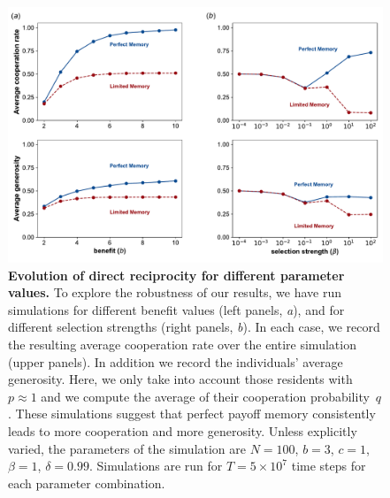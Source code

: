 \documentclass[11pt]{article}
\theoremstyle{plainCl1}
\theoremstyle{plainCl2}
\begin{document}
{\clearpage
\newpage


\begin{figure}[t]
    \centering
    \includegraphics[width=.75\textwidth]{static/cooperation_rate_over_b_and_beta.pdf}
    \caption{{\bf Evolution of direct reciprocity for different parameter values.} 
    To explore the robustness of our results, we have run simulations for different benefit values (left panels, {\it a}), and for different selection strengths (right panels, {\it b}). 
    In each case, we record the resulting average cooperation rate over the entire simulation (upper panels). 
    In addition we record the individuals' average generosity. 
    Here, we only take into account those residents with $p\! \approx\! 1$ and we compute
    the average of their cooperation probability~$q$. 
    These simulations suggest that perfect payoff memory consistently leads to more cooperation and more generosity. 
    Unless explicitly varied, the parameters of the simulation are $N\!=\!100$, $b\!=\!3$, $c\!=\!1$, $\beta\!=\!1$, $\delta\!=\!0.99$. 
    Simulations are run for $T\!=\!5\times 10^7$ time steps for each parameter combination.}
    \label{fig:cooperation_rate_over_benefit_and_beta}
\end{figure}


}
\end{document}
